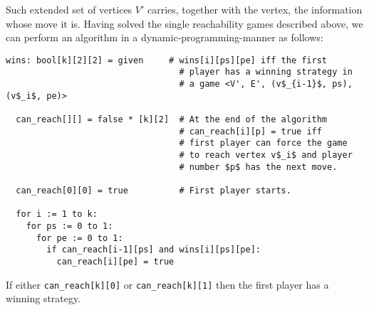 \noindent
Such extended set of vertices $V'$ carries, together with the vertex, the information whose move it is.
Having solved the single reachability games described above, we can perform an algorithm in a
dynamic-programming-manner as follows:
\begin{lstlisting}[tabsize=2]
  wins: bool[k][2][2] = given     # wins[i][ps][pe] iff the first
                                  # player has a winning strategy in
                                  # a game <V', E', (v$_{i-1}$, ps), (v$_i$, pe)>

  can_reach[][] = false * [k][2]  # At the end of the algorithm
                                  # can_reach[i][p] = true iff
                                  # first player can force the game
                                  # to reach vertex v$_i$ and player
                                  # number $p$ has the next move.
  
  can_reach[0][0] = true          # First player starts.

  for i := 1 to k:
    for ps := 0 to 1:
      for pe := 0 to 1:
        if can_reach[i-1][ps] and wins[i][ps][pe]:
          can_reach[i][pe] = true
\end{lstlisting}
If either \texttt{can\_reach[k][0]} or \texttt{can\_reach[k][1]} then the first
player has a winning strategy.\\

